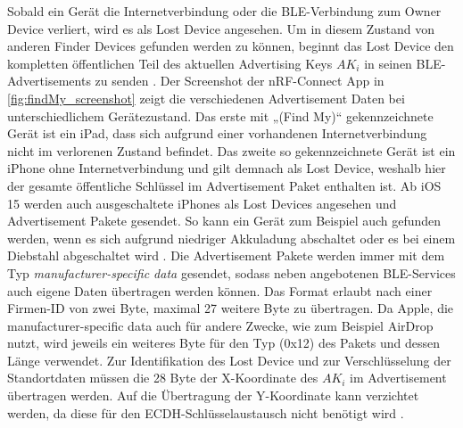 Sobald ein Gerät die Internetverbindung oder die \ac{BLE}-Verbindung zum Owner Device verliert, wird es als Lost Device angesehen.
Um in diesem Zustand von anderen Finder Devices gefunden werden zu können, beginnt das Lost Device den kompletten öffentlichen Teil des aktuellen Advertising Keys $AK_i$ in seinen \ac{BLE}-Advertisements zu senden \cite{Apple_FindMySpec}.
Der Screenshot der nRF-Connect App in \autoref{fig:findMy_screenshot} zeigt die verschiedenen Advertisement Daten bei unterschiedlichem Gerätezustand.
Das erste mit „(Find My)“ gekennzeichnete Gerät ist ein iPad, dass sich aufgrund einer vorhandenen Internetverbindung nicht im verlorenen Zustand befindet.
Das zweite so gekennzeichnete Gerät ist ein iPhone ohne Internetverbindung und gilt demnach als Lost Device, weshalb hier der gesamte öffentliche Schlüssel im Advertisement Paket enthalten ist.
Ab iOS 15 werden auch ausgeschaltete iPhones als Lost Devices angesehen und Advertisement Pakete gesendet.
So kann ein Gerät zum Beispiel auch gefunden werden, wenn es sich aufgrund niedriger Akkuladung abschaltet oder es bei einem Diebstahl abgeschaltet wird \cite{Classen_FindMy}.
Die Advertisement Pakete werden immer mit dem Typ \textit{manufacturer-specific data} gesendet, sodass neben angebotenen \ac{BLE}-Services auch eigene Daten übertragen werden können.
Das Format erlaubt nach einer Firmen-ID von zwei Byte, maximal 27 weitere Byte zu übertragen.
Da Apple, die manufacturer-specific data auch für andere Zwecke, wie zum Beispiel AirDrop nutzt, wird jeweils ein weiteres Byte für den Typ (0x12) des Pakets und dessen Länge verwendet.
Zur Identifikation des Lost Device und zur Verschlüsselung der Standortdaten müssen die 28 Byte der X-Koordinate des $AK_i$ im Advertisement übertragen werden.
Auf die Übertragung der Y-Koordinate kann verzichtet werden, da diese für den \ac{ECDH}-Schlüsselaustausch nicht benötigt wird \cite{Heinrich_FindMy}.

